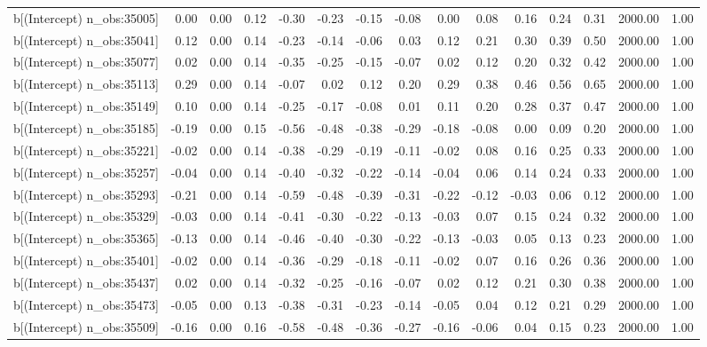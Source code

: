 \begin{table}[ht]
\begin{tabular}{rrrrrrrrrrrrrrr}
  b[(Intercept) n\_obs:35005] & 0.00 & 0.00 & 0.12 & -0.30 & -0.23 & -0.15 & -0.08 & 0.00 & 0.08 & 0.16 & 0.24 & 0.31 & 2000.00 & 1.00 \\ 
  b[(Intercept) n\_obs:35041] & 0.12 & 0.00 & 0.14 & -0.23 & -0.14 & -0.06 & 0.03 & 0.12 & 0.21 & 0.30 & 0.39 & 0.50 & 2000.00 & 1.00 \\ 
  b[(Intercept) n\_obs:35077] & 0.02 & 0.00 & 0.14 & -0.35 & -0.25 & -0.15 & -0.07 & 0.02 & 0.12 & 0.20 & 0.32 & 0.42 & 2000.00 & 1.00 \\ 
  b[(Intercept) n\_obs:35113] & 0.29 & 0.00 & 0.14 & -0.07 & 0.02 & 0.12 & 0.20 & 0.29 & 0.38 & 0.46 & 0.56 & 0.65 & 2000.00 & 1.00 \\ 
  b[(Intercept) n\_obs:35149] & 0.10 & 0.00 & 0.14 & -0.25 & -0.17 & -0.08 & 0.01 & 0.11 & 0.20 & 0.28 & 0.37 & 0.47 & 2000.00 & 1.00 \\ 
  b[(Intercept) n\_obs:35185] & -0.19 & 0.00 & 0.15 & -0.56 & -0.48 & -0.38 & -0.29 & -0.18 & -0.08 & 0.00 & 0.09 & 0.20 & 2000.00 & 1.00 \\ 
  b[(Intercept) n\_obs:35221] & -0.02 & 0.00 & 0.14 & -0.38 & -0.29 & -0.19 & -0.11 & -0.02 & 0.08 & 0.16 & 0.25 & 0.33 & 2000.00 & 1.00 \\ 
  b[(Intercept) n\_obs:35257] & -0.04 & 0.00 & 0.14 & -0.40 & -0.32 & -0.22 & -0.14 & -0.04 & 0.06 & 0.14 & 0.24 & 0.33 & 2000.00 & 1.00 \\ 
  b[(Intercept) n\_obs:35293] & -0.21 & 0.00 & 0.14 & -0.59 & -0.48 & -0.39 & -0.31 & -0.22 & -0.12 & -0.03 & 0.06 & 0.12 & 2000.00 & 1.00 \\ 
  b[(Intercept) n\_obs:35329] & -0.03 & 0.00 & 0.14 & -0.41 & -0.30 & -0.22 & -0.13 & -0.03 & 0.07 & 0.15 & 0.24 & 0.32 & 2000.00 & 1.00 \\ 
  b[(Intercept) n\_obs:35365] & -0.13 & 0.00 & 0.14 & -0.46 & -0.40 & -0.30 & -0.22 & -0.13 & -0.03 & 0.05 & 0.13 & 0.23 & 2000.00 & 1.00 \\ 
  b[(Intercept) n\_obs:35401] & -0.02 & 0.00 & 0.14 & -0.36 & -0.29 & -0.18 & -0.11 & -0.02 & 0.07 & 0.16 & 0.26 & 0.36 & 2000.00 & 1.00 \\ 
  b[(Intercept) n\_obs:35437] & 0.02 & 0.00 & 0.14 & -0.32 & -0.25 & -0.16 & -0.07 & 0.02 & 0.12 & 0.21 & 0.30 & 0.38 & 2000.00 & 1.00 \\ 
  b[(Intercept) n\_obs:35473] & -0.05 & 0.00 & 0.13 & -0.38 & -0.31 & -0.23 & -0.14 & -0.05 & 0.04 & 0.12 & 0.21 & 0.29 & 2000.00 & 1.00 \\ 
  b[(Intercept) n\_obs:35509] & -0.16 & 0.00 & 0.16 & -0.58 & -0.48 & -0.36 & -0.27 & -0.16 & -0.06 & 0.04 & 0.15 & 0.23 & 2000.00 & 1.00 \\ 

\end{tabular}
\end{table}
